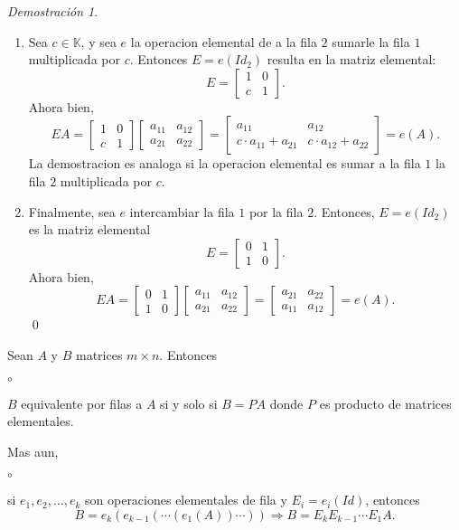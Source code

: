 \documentclass{article}
\theoremstyle{definition}
\theoremstyle{definition}
\theoremstyle{remark}
\newtheorem*{demo}{Demostración}
\begin{document}
\begin{demo}
\begin{enumerate}[label=\textcolor{azulp2}{E\arabic*.}]
\item Sea $c \in \mathbb{K}$, y sea $e$ la operacion elemental de a la fila $2$ sumarle la fila $1$ multiplicada por $c$. Entonces $E=e(Id_2)$ resulta en la matriz elemental: \[
    E=\begin{bmatrix} 1 & 0 \\ c & 1 \end{bmatrix}.
    \]Ahora bien, \[
    EA=\begin{bmatrix} 1 & 0 \\ c & 1 \end{bmatrix} \begin{bmatrix} a_{11} & a_{12} \\ a_{21} & a_{22} \end{bmatrix} = \begin{bmatrix} a_{11} & a_{12} \\ c \cdot a_{11}+a_{21} & c \cdot a_{12} + a_{22} \end{bmatrix}=e(A).
  \]
  La demostracion es analoga si la operacion elemental es sumar a la fila $1$ la fila $2$ multiplicada por $c$. 
\item Finalmente, sea $e$ intercambiar la fila $1$ por la fila $2$. Entonces, $E=e(Id_2)$ es la matriz elemental \[
    E=\begin{bmatrix} 0 & 1 \\ 1 & 0 \end{bmatrix}.
    \]Ahora bien, \[
    EA=\begin{bmatrix} 0 & 1 \\ 1 & 0 \end{bmatrix} \begin{bmatrix} a_{11} & a_{12} \\ a_{21} & a_{22} \end{bmatrix} = \begin{bmatrix} a_{21} & a_{22} \\ a_{11} & a_{12} \end{bmatrix} = e(A).
  \]\qed
 \end{enumerate}
 \end{demo}
 \begin{corol} Sean $A$ y $B$ matrices $m \times n$. Entonces
\begin{list}{$\circ$}{}  
\item $B$ equivalente por filas a $A$ si y solo si $B=PA$ donde $P$ es producto de matrices elementales. 
\end{list}
Mas aun, 
\begin{list}{$\circ$}{}  
\item si $e_1,e_2, \dots,e_k$ son operaciones elementales de fila y $E_i=e_i(Id)$, entonces \[
    B=e_k(e_{k-1}(\cdots(e_1(A))\cdots)) \Rightarrow B=E_kE_{k-1}\cdots E_1 A.
  \]
\end{list}
 \end{corol}
\pagebreak 
\end{document}
